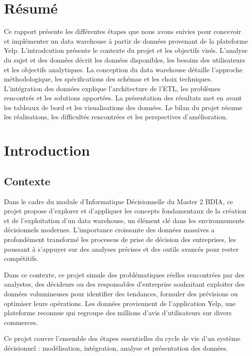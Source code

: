 \usepackage{graphicx}

\section*{Résumé}

Ce rapport présente les différentes étapes que nous avons suivies pour concevoir et implémenter un data warehouse à partir de données provenant de la plateforme Yelp.
L'introdcution présente le contexte du projet et les objectifs visés.
L'analyse du sujet et des données décrit les données disponibles, les besoins des utilisateurs et les objectifs analytiques.
La conception du data warehouse détaille l'approche méthodologique, les spécifications des schémas et les choix techniques.
L'intégration des données explique l'architecture de l'ETL, les problèmes rencontrés et les solutions apportées.
La présentation des résultats met en avant les tableaux de bord et les visualisations des données.
Le bilan du projet résume les réalisations, les difficultés rencontrées et les perspectives d'amélioration.


\section*{Introduction}

\subsection{Contexte}\label{subsec:contexte}
Dans le cadre du module d’Informatique Décisionnelle du Master 2 BDIA, ce projet propose d’explorer et d’appliquer les concepts fondamentaux de la création et de l’exploitation d’un data warehouse, un élément clé dans les environnements décisionnels modernes. L’importance croissante des données massives a profondément transformé les processus de prise de décision des entreprises, les poussant à s’appuyer sur des analyses précises et des outils avancés pour rester compétitifs.

Dans ce contexte, ce projet simule des problématiques réelles rencontrées par des analystes, des décideurs ou des responsables d’entreprise souhaitant exploiter des données volumineuses pour identifier des tendances, formuler des prévisions ou optimiser leurs opérations. Les données proviennent de l’application Yelp, une plateforme reconnue qui regroupe des millions d’avis d’utilisateurs sur divers commerces. 

Ce projet couvre l’ensemble des étapes essentielles du cycle de vie d’un système décisionnel : modélisation, intégration, analyse et présentation des données.



